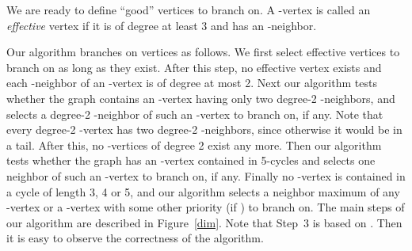 \documentclass{elsart_TR2}
\begin{document}
We are ready to define ``good'' vertices to branch on.
A -vertex  is called an \emph{effective} vertex if it is of degree at least 3 and has an -neighbor.


Our algorithm branches on vertices as follows.
We first select effective vertices to branch on as long as they exist.
After this step, no effective vertex exists and each -neighbor of an -vertex is of degree at most 2.
Next our algorithm tests whether the graph contains an -vertex 
having only two degree-2 -neighbors,
and selects a degree-2 -neighbor  of such an -vertex  to branch on, if any.
Note that every degree-2 -vertex has two degree-2 -neighbors, since otherwise it would be in a tail.
After this, no -vertices of degree 2 exist  any more.
Then our algorithm tests whether the graph has an -vertex contained in 5-cycles
 and selects one neighbor  of such an -vertex to branch on, if any.
Finally no -vertex is contained in a cycle of length 3, 4 or 5,
and our algorithm selects a neighbor  maximum  of any -vertex  or
a -vertex  with some other priority (if ) to branch on.
The main steps of our algorithm are described in Figure~\ref{dim}.
Note that Step~3 is based on .
Then it is easy to observe the correctness of the algorithm.
\end{document}
